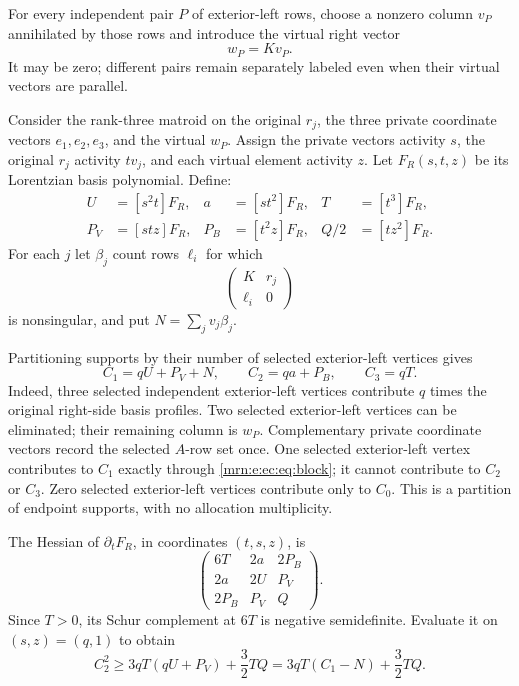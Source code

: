 \documentclass[11pt,a4paper]{article}
\theoremstyle{remark}\newtheorem{remark}[theorem]{Remark}
\begin{document}
For every independent pair $P$ of exterior-left rows, choose a nonzero column $v_P$ annihilated by those rows and introduce the virtual right vector
\[
 w_P=Kv_P.
\]
It may be zero; different pairs remain separately labeled even when their virtual vectors are parallel.

Consider the rank-three matroid on the original $r_j$, the three private coordinate vectors $e_1,e_2,e_3$, and the virtual $w_P$. Assign the private vectors activity $s$, the original $r_j$ activity $tv_j$, and each virtual element activity $z$. Let $F_R(s,t,z)$ be its Lorentzian basis polynomial. Define:
\[
\begin{aligned}
 U&=[s^2t]F_R,& a&=[st^2]F_R,& T&=[t^3]F_R,\\
 P_V&=[stz]F_R,& P_B&=[t^2z]F_R,& Q/2&=[tz^2]F_R.
\end{aligned}
\]
For each $j$ let $\beta_j$ count rows $\ell_i$ for which
\begin{equation}\label{mrn:e:ec:eq:block}
 \begin{pmatrix}K&r_j\\ \ell_i&0\end{pmatrix}
\end{equation}
is nonsingular, and put $N=\sum_jv_j\beta_j$.

Partitioning supports by their number of selected exterior-left vertices gives
\begin{equation}\label{mrn:e:ec:eq:sectors}
 C_1=qU+P_V+N,\qquad C_2=qa+P_B,\qquad C_3=qT.
\end{equation}
Indeed, three selected independent exterior-left vertices contribute $q$ times the original right-side basis profiles. Two selected exterior-left vertices can be eliminated; their remaining column is $w_P$. Complementary private coordinate vectors record the selected $A$-row set once. One selected exterior-left vertex contributes to $C_1$ exactly through \eqref{mrn:e:ec:eq:block}; it cannot contribute to $C_2$ or $C_3$. Zero selected exterior-left vertices contribute only to $C_0$. This is a partition of endpoint supports, with no allocation multiplicity.

The Hessian of $\partial_tF_R$, in coordinates $(t,s,z)$, is
\[
 \begin{pmatrix}
 6T&2a&2P_B\\
 2a&2U&P_V\\
 2P_B&P_V&Q
 \end{pmatrix}.
\]
Since $T>0$, its Schur complement at $6T$ is negative semidefinite. Evaluate it on $(s,z)=(q,1)$ to obtain
\begin{equation}\label{mrn:e:ec:eq:rightschur}
 C_2^2\ge3qT(qU+P_V)+\frac32TQ
       =3qT(C_1-N)+\frac32TQ.
\end{equation}
\end{document}
